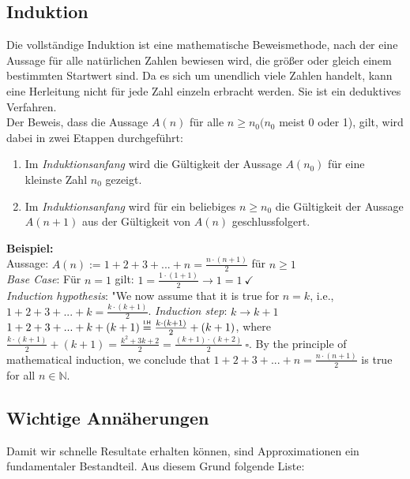 \documentclass[a4paper]{article}
\newcommand\myEqualOne{\mathrel{\overset{\makebox[0pt]{\mbox{\normalfont\tiny\sffamily I.H}}}{=}}}
\begin{document}
\subsection{Induktion}
    Die vollständige Induktion ist eine mathematische Beweismethode, nach der eine Aussage für alle natürlichen Zahlen bewiesen wird, die größer oder gleich einem bestimmten Startwert sind. Da es sich um unendlich viele Zahlen handelt, kann eine Herleitung nicht für jede Zahl einzeln erbracht werden. Sie ist ein deduktives Verfahren. \\
    Der Beweis, dass die Aussage $A(n)$ für alle $n \geq n_0 (n_0$ meist 0 oder 1), gilt, wird dabei in zwei Etappen durchgeführt:
    \begin{enumerate}
        \item Im \textit{Induktionsanfang} wird die Gültigkeit der Aussage $A(n_0)$ für eine kleinste Zahl $n_0$ gezeigt.
        \item Im \textit{Induktionsanfang} wird für ein beliebiges $n \geq n_0$ die Gültigkeit der Aussage $A(n+1)$ aus der Gültigkeit von $A(n)$ geschlussfolgert.
    \end{enumerate}
    \textbf{Beispiel:} \\
        Aussage: $A(n):= 1 + 2 + 3 + ...+ n = \frac{n \cdot (n+1)}{2}$ für $n \geq 1$ \\
        \textit{Base Case}: Für $n = 1$ gilt: $1 = \frac{1 \cdot (1+1)}{2} \rightarrow 1 = 1 \ \checkmark$ \\
        \textit{Induction hypothesis}: "We now assume that it is true for $n = k$, i.e., $1 + 2 + 3 + ...+ k = \frac{k \cdot (k+1)}{2} $.
        \textit{Induction step}: $k \rightarrow k+1$ \\
        $1 + 2 + 3 + ...+ k + (k+1) \myEqualOne  \frac{k \cdot (k+1)}{2} + (k+1)$, where $\frac{k \cdot (k+1)}{2} + (k+1) = \frac{k^2 + 3k + 2}{2} = \frac{(k+1) \cdot (k+2)}{2} \ \square.$
        By the principle of mathematical induction, we conclude that $ 1 + 2 + 3 + ...+ n = \frac{n \cdot (n+1)}{2}$ is true for all $n \in \mathbb{N}.$
        \\
        
    \subsection{Wichtige Annäherungen}
    Damit wir schnelle Resultate erhalten können, sind Approximationen ein fundamentaler Bestandteil. Aus diesem Grund folgende Liste:
\end{document}
